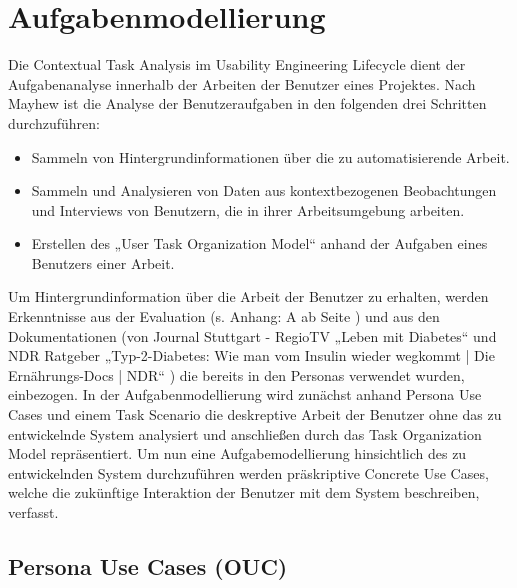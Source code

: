 \section{Aufgabenmodellierung}

Die Contextual Task Analysis im Usability Engineering Lifecycle dient der Aufgabenanalyse innerhalb der Arbeiten der Benutzer eines Projektes. Nach Mayhew \cite{MD} ist die Analyse der Benutzeraufgaben in den folgenden drei Schritten durchzuführen:
\begin{itemize}
	\item Sammeln von Hintergrundinformationen über die zu automatisierende Arbeit.
	\item Sammeln und Analysieren von Daten aus kontextbezogenen Beobachtungen und Interviews von Benutzern, die in ihrer Arbeitsumgebung arbeiten.
	\item Erstellen des „User Task Organization Model“ anhand der Aufgaben eines Benutzers einer Arbeit.
\end{itemize}

Um Hintergrundinformation über die Arbeit der Benutzer zu erhalten, werden Erkenntnisse aus der Evaluation (s. Anhang: A  ab Seite \pageref{section:Evaluation}) und aus den Dokumentationen (von Journal Stuttgart - RegioTV „Leben mit Diabetes“ \cite{JS} und NDR Ratgeber „Typ-2-Diabetes: Wie man vom Insulin wieder wegkommt | Die Ernährungs-Docs | NDR“ \cite{DED}) die bereits in den Personas verwendet wurden, einbezogen.\newline
In der Aufgabenmodellierung wird zunächst anhand Persona Use Cases und einem Task Scenario die deskreptive Arbeit der Benutzer ohne das zu entwickelnde System analysiert und anschließen durch das Task Organization Model repräsentiert. Um nun eine Aufgabemodellierung hinsichtlich des zu entwickelnden System durchzuführen werden präskriptive Concrete Use Cases, welche die zukünftige Interaktion der Benutzer mit dem System beschreiben, verfasst. 

\subsection{Persona Use Cases (OUC)}

